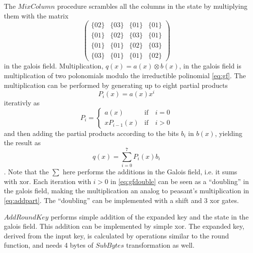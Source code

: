 The $MixColumn$ procedure scrambles all the columns in the state
by multiplying them with the matrix
\begin{equation}
  \begin{pmatrix}
    \{02\} & \{03\} & \{01\} & \{01\} \\
    \{01\} & \{02\} & \{03\} & \{01\} \\
    \{01\} & \{01\} & \{02\} & \{03\} \\
    \{03\} & \{01\} & \{01\} & \{02\}
  \end{pmatrix}
  \label{eq:mixcol}
\end{equation}
in the galois field. Multiplication, $q(x)=a(x) \otimes b(x)$, in the
galois field is multiplication of two polonomials modulo the
irreductible polinomial \eqref{eq:gf}. The multiplication can be
performed by generating up to eight partial products
\begin{equation}
  P_i(x) = a(x) x^i
\end{equation}
iterativly as 
\begin{equation} 
  P_i = 
  \begin{cases}
    a(x) & \text{if} \quad i = 0 \\
    x P_{i-1}(x) & \text{if} \quad i > 0
  \end{cases}
  \label{eq:gfdouble}
\end{equation}
and then adding the partial products according to the bits $b_i$ in
$b(x)$, yielding the result as
\begin{equation}
  q(x) = \sum_{i=0}^{7} P_i(x) b_i
  \label{eq:addpart}
\end{equation}
. Note that the $\sum$ here
performs the additions in the Galois field, i.e. it sums with
xor. Each iteration with $i > 0$ in \eqref{eq:gfdouble} can be seen as
a ``doubling'' in the galois field, making the multiplication an
analog to peasant's multiplication in \eqref{eq:addpart}. The
``doubling'' can be implemented with a shift and 3 xor gates.

$AddRoundKey$ performs simple addition of the expanded key and the
state in the galois field. This addition can be implemented by simple
xor. The expanded key, derived from the input key, is calculated by
operations similar to the round function, and needs 4 bytes of
$SubBytes$ transformation as well.

